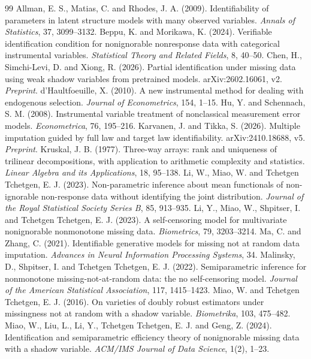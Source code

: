 \documentclass[11pt,a4paper]{ltjsarticle}
\theoremstyle{remark}\newtheorem{remark}{注意}[section]
\begin{document}
\begin{thebibliography}{99}\small
{} Allman, E. S., Matias, C. and Rhodes, J. A. (2009). Identifiability of parameters in latent structure models with many observed variables. \emph{Annals of Statistics}, 37, 3099--3132.
 Beppu, K. and Morikawa, K. (2024). Verifiable identification condition for nonignorable nonresponse data with categorical instrumental variables. \emph{Statistical Theory and Related Fields}, 8, 40--50.
 Chen, H., Simchi-Levi, D. and Xiong, R. (2026). Partial identification under missing data using weak shadow variables from pretrained models. arXiv:2602.16061, v2. \emph{Preprint}.
 d'Haultfoeuille, X. (2010). A new instrumental method for dealing with endogenous selection. \emph{Journal of Econometrics}, 154, 1--15.
 Hu, Y. and Schennach, S. M. (2008). Instrumental variable treatment of nonclassical measurement error models. \emph{Econometrica}, 76, 195--216.
 Karvanen, J. and Tikka, S. (2026). Multiple imputation guided by full law and target law identifiability. arXiv:2410.18688, v5. \emph{Preprint}.
 Kruskal, J. B. (1977). Three-way arrays: rank and uniqueness of trilinear decompositions, with application to arithmetic complexity and statistics. \emph{Linear Algebra and its Applications}, 18, 95--138.
 Li, W., Miao, W. and Tchetgen Tchetgen, E. J. (2023). Non-parametric inference about mean functionals of non-ignorable non-response data without identifying the joint distribution. \emph{Journal of the Royal Statistical Society Series B}, 85, 913--935.
 Li, Y., Miao, W., Shpitser, I. and Tchetgen Tchetgen, E. J. (2023). A self-censoring model for multivariate nonignorable nonmonotone missing data. \emph{Biometrics}, 79, 3203--3214.
 Ma, C. and Zhang, C. (2021). Identifiable generative models for missing not at random data imputation. \emph{Advances in Neural Information Processing Systems}, 34.
 Malinsky, D., Shpitser, I. and Tchetgen Tchetgen, E. J. (2022). Semiparametric inference for nonmonotone missing-not-at-random data: the no self-censoring model. \emph{Journal of the American Statistical Association}, 117, 1415--1423.
 Miao, W. and Tchetgen Tchetgen, E. J. (2016). On varieties of doubly robust estimators under missingness not at random with a shadow variable. \emph{Biometrika}, 103, 475--482.
 Miao, W., Liu, L., Li, Y., Tchetgen Tchetgen, E. J. and Geng, Z. (2024). Identification and semiparametric efficiency theory of nonignorable missing data with a shadow variable. \emph{ACM/IMS Journal of Data Science}, 1(2), 1--23.

\end{thebibliography}
\end{document}
